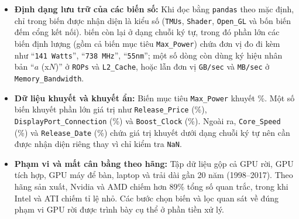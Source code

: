 {\sloppy
\begin{itemize}
  \item \textbf{Định dạng lưu trữ của các biến số:} Khi đọc bằng \texttt{pandas} theo mặc
    định, chỉ \OvwDefaultNumericCols{} trong \OvwColsRaw{} biến được nhận diện là kiểu số
    (\texttt{TMUs}, \texttt{Shader}, \texttt{Open\_GL} và bốn biến đếm cổng kết nối).
    \OvwDefaultObjectCols{} biến còn lại ở dạng chuỗi ký tự, trong đó phần lớn các biến
    định lượng (gồm cả biến mục tiêu \texttt{Max\_Power}) chứa đơn vị đo đi kèm như
    ``\texttt{141 Watts}'', ``\texttt{738 MHz}'', ``\texttt{55nm}''; một số dòng còn dùng
    ký hiệu nhân bản ``$a$ (x$N$)'' ở \texttt{ROPs} và \texttt{L2\_Cache}, hoặc
    lẫn đơn vị \texttt{GB/sec} và \texttt{MB/sec} ở \texttt{Memory\_Bandwidth}.
  \item \textbf{Dữ liệu khuyết và khuyết ẩn:} Biến mục tiêu \texttt{Max\_Power} khuyết
    \OvwPowerMissingPct{}\%. Một số biến khuyết phần lớn giá trị như
    \texttt{Release\_Price} (\OvwPriceMissingPct{}\%),
    \texttt{DisplayPort\_\allowbreak{}Connection} (\OvwDpMissingPct{}\%) và
    \texttt{Boost\_Clock} (\OvwBoostMissingPct{}\%). Ngoài ra, \texttt{Core\_Speed}
    (\OvwCoreSpeedMissingPct{}\%) và \texttt{Release\_Date} (\OvwDateUnknownPct{}\%) chứa
    giá trị khuyết dưới dạng chuỗi ký tự nên cần được nhận diện riêng thay vì chỉ kiểm tra
    \texttt{NaN}.
  \item \textbf{Phạm vi và mất cân bằng theo hãng:} Tập dữ liệu gộp cả GPU rời, GPU tích
    hợp, GPU máy để bàn, laptop và trải dài gần 20 năm (1998--2017). Theo hãng sản xuất,
    Nvidia và AMD chiếm hơn 89\% tổng số quan trắc, trong khi Intel và ATI chiếm tỉ lệ
    nhỏ. Các bước chọn biến và lọc quan sát về đúng phạm vi GPU rời được trình bày cụ thể
    ở phần tiền xử lý.
\end{itemize}
\par}
